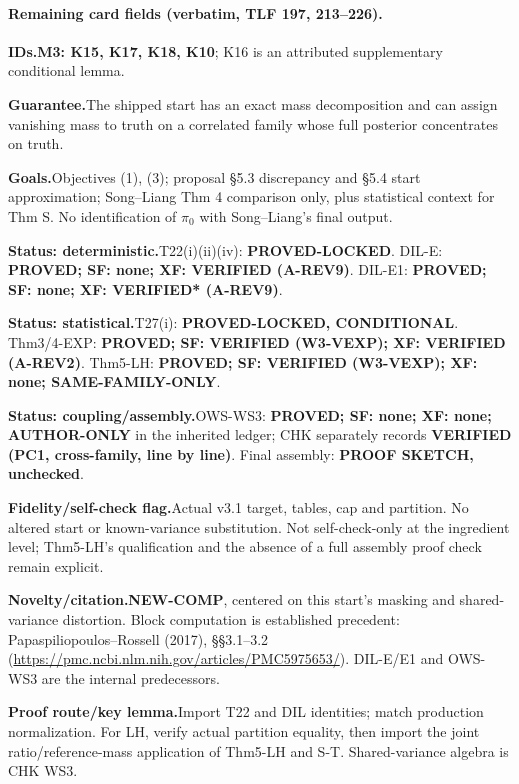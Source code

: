 \paragraph{Remaining card fields (verbatim, TLF 197, 213–226).}
{\small
\par\smallskip\noindent\textbf{IDs.}\enspace \textbf{M3: K15, K17, K18, K10}; K16 is an attributed supplementary conditional lemma.
\par\smallskip\noindent\textbf{Guarantee.}\enspace The shipped start has an exact mass decomposition and can assign vanishing mass to truth on a correlated family whose full posterior concentrates on truth.
\par\smallskip\noindent\textbf{Goals.}\enspace Objectives (1), (3); proposal §5.3 discrepancy and §5.4 start approximation; Song–Liang Thm 4 comparison only, plus statistical context for Thm S. No identification of \(\pi_0\) with Song–Liang’s final output.
\par\smallskip\noindent\textbf{Status: deterministic.}\enspace T22(i)(ii)(iv): \textbf{PROVED-LOCKED}. DIL-E: \textbf{PROVED; SF: none; XF: VERIFIED (A-REV9)}. DIL-E1: \textbf{PROVED; SF: none; XF: VERIFIED* (A-REV9)}.
\par\smallskip\noindent\textbf{Status: statistical.}\enspace T27(i): \textbf{PROVED-LOCKED, CONDITIONAL}. Thm3/4-EXP: \textbf{PROVED; SF: VERIFIED (W3-VEXP); XF: VERIFIED (A-REV2)}. Thm5-LH: \textbf{PROVED; SF: VERIFIED (W3-VEXP); XF: none; SAME-FAMILY-ONLY}.
\par\smallskip\noindent\textbf{Status: coupling/assembly.}\enspace OWS-WS3: \textbf{PROVED; SF: none; XF: none; AUTHOR-ONLY} in the inherited ledger; CHK separately records \textbf{VERIFIED (PC1, cross-family, line by line)}. Final assembly: \textbf{PROOF SKETCH, unchecked}.
\par\smallskip\noindent\textbf{Fidelity/self-check flag.}\enspace Actual v3.1 target, tables, cap and partition. No altered start or known-variance substitution. Not self-check-only at the ingredient level; Thm5-LH’s qualification and the absence of a full assembly proof check remain explicit.
\par\smallskip\noindent\textbf{Novelty/citation.}\enspace \textbf{NEW-COMP}, centered on this start’s masking and shared-variance distortion. Block computation is established precedent: Papaspiliopoulos–Rossell (2017), §§3.1–3.2 (\url{https://pmc.ncbi.nlm.nih.gov/articles/PMC5975653/}). DIL-E/E1 and OWS-WS3 are the internal predecessors.
\par\smallskip\noindent\textbf{Proof route/key lemma.}\enspace Import T22 and DIL identities; match production normalization. For LH, verify actual partition equality, then import the joint ratio/reference-mass application of Thm5-LH and S-T. Shared-variance algebra is CHK WS3.
}
